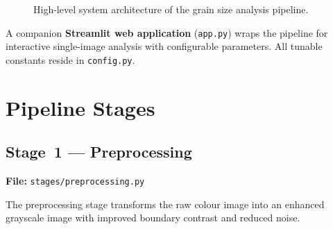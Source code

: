 \documentclass[12pt,a4paper]{article}
\newcommand{\file}[1]{\texttt{\small #1}}
\begin{document}
\begin{figure}[H]
    \centering
    \caption{High-level system architecture of the grain size analysis pipeline.}
    \label{fig:architecture}
\end{figure}

A companion \textbf{Streamlit web application} (\file{app.py}) wraps the
pipeline for interactive single-image analysis with configurable parameters.
All tunable constants reside in \file{config.py}.


\section{Pipeline Stages}

\subsection{Stage~1 --- Preprocessing}

\textbf{File:} \file{stages/preprocessing.py}

The preprocessing stage transforms the raw colour image into an enhanced
grayscale image with improved boundary contrast and reduced noise.
\end{document}
